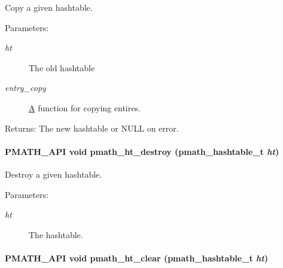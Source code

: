 Copy a given hashtable. 

\begin{Desc}
\item[Parameters:]
\begin{description}
\item[{\em ht}]The old hashtable \item[{\em entry\_\-copy}]\hyperlink{class_a}{A} function for copying entires. \end{description}
\end{Desc}
\begin{Desc}
\item[Returns:]The new hashtable or NULL on error. \end{Desc}
\hypertarget{group__hashtables_g48cbf069ed0fa62b2e95ec196aceff16}{
\paragraph[{pmath\_\-ht\_\-destroy}]{\setlength{\rightskip}{0pt plus 5cm}PMATH\_\-API void pmath\_\-ht\_\-destroy ({\bf pmath\_\-hashtable\_\-t} {\em ht})}\hfill}
\label{group__hashtables_g48cbf069ed0fa62b2e95ec196aceff16}


Destroy a given hashtable. 

\begin{Desc}
\item[Parameters:]
\begin{description}
\item[{\em ht}]The hashtable. \end{description}
\end{Desc}
\hypertarget{group__hashtables_gba9a2535237d8482482a338bafa2d5f1}{
\paragraph[{pmath\_\-ht\_\-clear}]{\setlength{\rightskip}{0pt plus 5cm}PMATH\_\-API void pmath\_\-ht\_\-clear ({\bf pmath\_\-hashtable\_\-t} {\em ht})}\hfill}
\label{group__hashtables_gba9a2535237d8482482a338bafa2d5f1}


